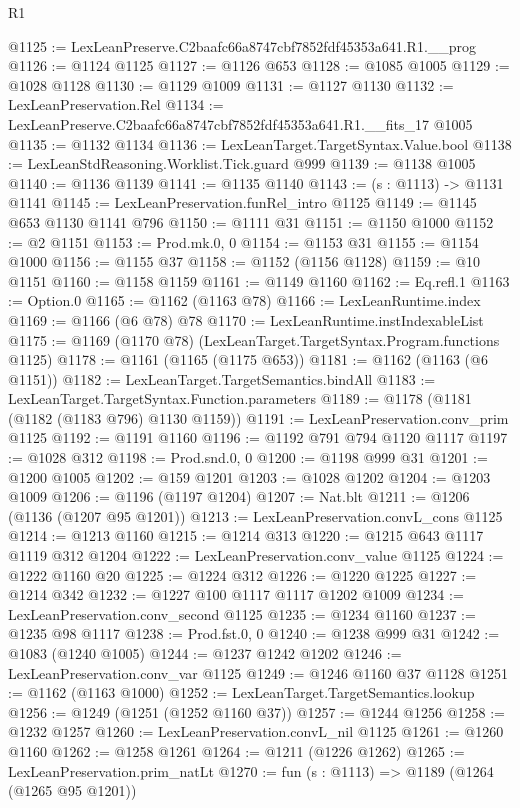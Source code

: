 \begin{lexlean}{R1}
\begin{coremodule}
@1125 := LexLeanPreserve.C2baafc66a8747cbf7852fdf45353a641.R1.__prog
@1126 := @1124 @1125
@1127 := @1126 @653
@1128 := @1085 @1005
@1129 := @1028 @1128
@1130 := @1129 @1009
@1131 := @1127 @1130
@1132 := LexLeanPreservation.Rel
@1134 := LexLeanPreserve.C2baafc66a8747cbf7852fdf45353a641.R1.__fits_17 @1005
@1135 := @1132 @1134
@1136 := LexLeanTarget.TargetSyntax.Value.bool
@1138 := LexLeanStdReasoning.Worklist.Tick.guard @999
@1139 := @1138 @1005
@1140 := @1136 @1139
@1141 := @1135 @1140
@1143 := (s : @1113) -> @1131 @1141
@1145 := LexLeanPreservation.funRel_intro @1125
@1149 := @1145 @653 @1130 @1141 @796
@1150 := @1111 @31
@1151 := @1150 @1000
@1152 := @2 @1151
@1153 := Prod.mk.{0, 0}
@1154 := @1153 @31
@1155 := @1154 @1000
@1156 := @1155 @37
@1158 := @1152 (@1156 @1128)
@1159 := @10 @1151
@1160 := @1158 @1159
@1161 := @1149 @1160
@1162 := Eq.refl.{1}
@1163 := Option.{0}
@1165 := @1162 (@1163 @78)
@1166 := LexLeanRuntime.index
@1169 := @1166 (@6 @78) @78
@1170 := LexLeanRuntime.instIndexableList
@1175 := @1169 (@1170 @78) (LexLeanTarget.TargetSyntax.Program.functions @1125)
@1178 := @1161 (@1165 (@1175 @653))
@1181 := @1162 (@1163 (@6 @1151))
@1182 := LexLeanTarget.TargetSemantics.bindAll
@1183 := LexLeanTarget.TargetSyntax.Function.parameters
@1189 := @1178 (@1181 (@1182 (@1183 @796) @1130 @1159))
@1191 := LexLeanPreservation.conv_prim @1125
@1192 := @1191 @1160
@1196 := @1192 @791 @794 @1120 @1117
@1197 := @1028 @312
@1198 := Prod.snd.{0, 0}
@1200 := @1198 @999 @31
@1201 := @1200 @1005
@1202 := @159 @1201
@1203 := @1028 @1202
@1204 := @1203 @1009
@1206 := @1196 (@1197 @1204)
@1207 := Nat.blt
@1211 := @1206 (@1136 (@1207 @95 @1201))
@1213 := LexLeanPreservation.convL_cons @1125
@1214 := @1213 @1160
@1215 := @1214 @313
@1220 := @1215 @643 @1117 @1119 @312 @1204
@1222 := LexLeanPreservation.conv_value @1125
@1224 := @1222 @1160 @20
@1225 := @1224 @312
@1226 := @1220 @1225
@1227 := @1214 @342
@1232 := @1227 @100 @1117 @1117 @1202 @1009
@1234 := LexLeanPreservation.conv_second @1125
@1235 := @1234 @1160
@1237 := @1235 @98 @1117
@1238 := Prod.fst.{0, 0}
@1240 := @1238 @999 @31
@1242 := @1083 (@1240 @1005)
@1244 := @1237 @1242 @1202
@1246 := LexLeanPreservation.conv_var @1125
@1249 := @1246 @1160 @37 @1128
@1251 := @1162 (@1163 @1000)
@1252 := LexLeanTarget.TargetSemantics.lookup
@1256 := @1249 (@1251 (@1252 @1160 @37))
@1257 := @1244 @1256
@1258 := @1232 @1257
@1260 := LexLeanPreservation.convL_nil @1125
@1261 := @1260 @1160
@1262 := @1258 @1261
@1264 := @1211 (@1226 @1262)
@1265 := LexLeanPreservation.prim_natLt
@1270 := fun (s : @1113) => @1189 (@1264 (@1265 @95 @1201))

\end{coremodule}
\end{lexlean}
